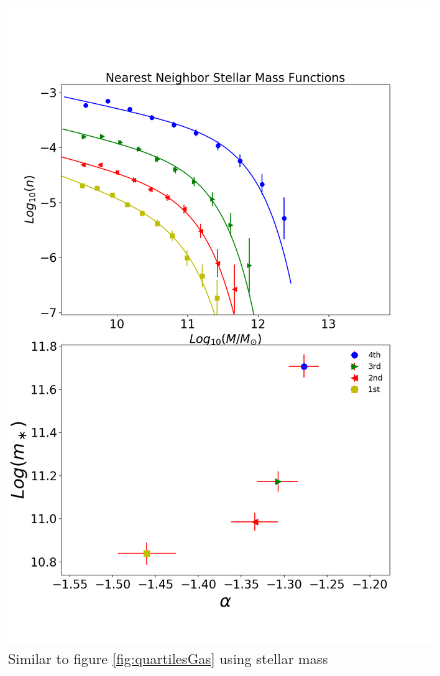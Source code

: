 \documentclass[a4paper,fleqn,usenatbib]{mnras}
\begin{document}
\begin{figure}
	\includegraphics[width=\columnwidth]{./pics/F19_quartilesSellar.png}
    \caption{Similar to figure \ref{fig:quartilesGas} using stellar mass} 
    \label{fig:quartilesStellar}
\end{figure}
\end{document}
